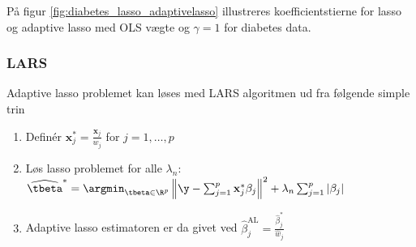 \begin{eks}
På figur \ref{fig:diabetes_lasso_adaptivelasso} illustreres koefficientstierne for lasso og adaptive lasso med OLS vægte og \(\gamma = 1\) for diabetes data.

\end{eks}

\subsubsection{LARS}
Adaptive lasso problemet kan løses med LARS algoritmen ud fra følgende simple trin
\begin{enumerate}
\item Definér \(\mathbf{x}_j^{*} = \frac{\mathbf{x}_j}{\widehat{w}_j}\) for \(j=1, \ldots, p\)
\item Løs lasso problemet for alle \(\lambda_n\): \(\widehat{\tbeta}^{*} = \argmin_{\tbeta \in \R^p} \left\Vert \y - \sum_{j=1}^p \mathbf{x}_j^{*} \beta_j \right\Vert^2 + \lambda_n \sum_{j=1}^p \vert \beta_j \vert\)
\item Adaptive lasso estimatoren er da givet ved \(\widehat{\beta}_j^{\text{AL}} = \frac{\widehat{\beta}_j^{*}}{\widehat{w}_j}\)
\end{enumerate}
%
%